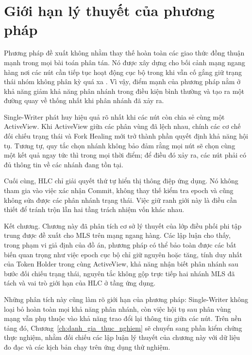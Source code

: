 \documentclass[../DoAn.tex]{subfiles}
\begin{document}
\section{Giới hạn lý thuyết của phương pháp}
\label{sec:gioi_han_ly_thuyet}

Phương pháp đề xuất không nhằm thay thế hoàn toàn các giao thức đồng thuận mạnh trong mọi bài toán phân tán. Nó được xây dựng cho bối cảnh mạng ngang hàng nơi các nút cần tiếp tục hoạt động cục bộ trong khi vẫn cố gắng giữ trạng thái nhóm không phân kỳ quá xa \cite{gilbert2002brewers,localfirst2019}. Vì vậy, điểm mạnh của phương pháp nằm ở khả năng giảm khả năng phân nhánh trong điều kiện bình thường và tạo ra một đường quay về thống nhất khi phân nhánh đã xảy ra.

Single-Writer phát huy hiệu quả rõ nhất khi các nút còn chia sẻ cùng một ActiveView. Khi ActiveView giữa các phân vùng đã lệch nhau, chính các cơ chế đối chiếu trạng thái và Fork Healing mới trở thành phần quyết định khả năng hội tụ. Tương tự, quy tắc chọn nhánh không bảo đảm rằng mọi nút sẽ chọn cùng một kết quả ngay tức thì trong mọi thời điểm; để điều đó xảy ra, các nút phải có đủ thông tin về các nhánh đang tồn tại.

Cuối cùng, HLC chỉ giải quyết thứ tự hiển thị thông điệp ứng dụng. Nó không tham gia vào việc xác nhận Commit, không thay thế kiểm tra epoch và cũng không sửa được các phân nhánh trạng thái. Việc giữ ranh giới này là điều cần thiết để tránh trộn lẫn hai tầng trách nhiệm vốn khác nhau.

Kết chương. Chương này đã phân tích cơ sở lý thuyết của lớp điều phối phi tập trung được đề xuất cho MLS trên mạng ngang hàng. Các lập luận cho thấy, trong phạm vi giả định của đồ án, phương pháp có thể bảo toàn được các bất biến quan trọng như việc epoch cục bộ chỉ giữ nguyên hoặc tăng, tính duy nhất của Token Holder trong cùng ActiveView, khả năng nhận biết phân nhánh sau bước đối chiếu trạng thái, nguyên tắc không gộp trực tiếp hai nhánh MLS đã tách và vai trò giới hạn của HLC ở tầng ứng dụng.

Những phân tích này cũng làm rõ giới hạn của phương pháp: Single-Writer không loại bỏ hoàn toàn mọi khả năng phân nhánh, còn việc hội tụ sau phân vùng mạng vẫn phụ thuộc vào khả năng trao đổi lại thông tin giữa các nút. Trên nền tảng đó, Chương~\ref{ch:danh_gia_thuc_nghiem} sẽ chuyển sang phần kiểm chứng thực nghiệm, nhằm đối chiếu các lập luận lý thuyết của chương này với dữ liệu đo đạc và các kịch bản chạy trên ứng dụng thử nghiệm.
\end{document}
